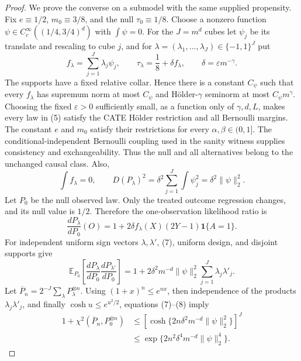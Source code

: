 \documentclass{article}
\begin{document}
\begin{proof}
We prove the converse on a submodel with the same supplied propensity. Fix \(e\equiv1/2\), \(m_0\equiv3/8\), and the null \(\tau_0\equiv1/8\). Choose a nonzero function \(\psi\in C_c^\infty((1/4,3/4)^d)\) with \(\int\psi=0\). For the \(J=m^d\) cubes let \(\psi_j\) be its translate and rescaling to cube \(j\), and for \(\lambda=(\lambda_1,\ldots,\lambda_J)\in\{-1,1\}^J\) put
\[
 f_\lambda=\sum_{j=1}^J\lambda_j\psi_j,
 \qquad
 \tau_\lambda=\frac18+\delta f_\lambda,
 \qquad
 \delta=\varepsilon m^{-\gamma}.                                    \tag{5}
\]
The supports have a fixed relative collar. Hence there is a constant \(C_\psi\) such that every \(f_\lambda\) has supremum norm at most \(C_\psi\) and Hölder-\(\gamma\) seminorm at most \(C_\psi m^\gamma\). Choosing the fixed \(\varepsilon>0\) sufficiently small, as a function only of \(\gamma,d,L\), makes every law in (5) satisfy the CATE Hölder restriction and all Bernoulli margins. The constant \(e\) and \(m_0\) satisfy their restrictions for every \(\alpha,\beta\in(0,1]\). The conditional-independent Bernoulli coupling used in the sanity witness supplies consistency and exchangeability. Thus the null and all alternatives belong to the unchanged causal class. Also,
\[
 \int f_\lambda=0,
 \qquad
 D(P_\lambda)^2
 =\delta^2\sum_{j=1}^J\int\psi_j^2
 =\delta^2\lVert\psi\rVert_2^2.                                    \tag{6}
\]
Let \(P_0\) be the null observed law. Only the treated outcome regression changes, and its null value is \(1/2\). Therefore the one-observation likelihood ratio is
\[
 \frac{dP_\lambda}{dP_0}(O)
 =1+2\delta f_\lambda(X)(2Y-1)\mathbf1\{A=1\}.                       \tag{7}
\]
For independent uniform sign vectors \(\lambda,\lambda'\), (7), uniform design, and disjoint supports give
\[
 \mathbb E_{P_0}\!\left[\frac{dP_\lambda}{dP_0}
                         \frac{dP_{\lambda'}}{dP_0}\right]
 =1+2\delta^2m^{-d}\lVert\psi\rVert_2^2
       \sum_{j=1}^J\lambda_j\lambda'_j.                              \tag{8}
\]
Let \(\overline P_n=2^{-J}\sum_\lambda P_\lambda^{\otimes n}\). Using \((1+x)^n\le e^{nx}\), then independence of the products \(\lambda_j\lambda'_j\), and finally \(\cosh u\le e^{u^2/2}\), equations (7)--(8) imply
\[
 \begin{aligned}
 1+\chi^2(\overline P_n,P_0^{\otimes n})
 &\le\left[\cosh\{2n\delta^2m^{-d}\lVert\psi\rVert_2^2\}\right]^J\\
 &\le\exp\{2n^2\delta^4m^{-d}\lVert\psi\rVert_2^4\}.
 \end{aligned}                                                       \tag{9}
\]

\end{proof}
\end{document}

